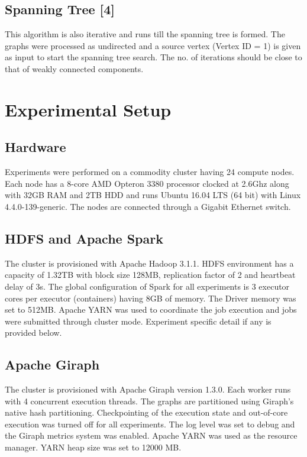 \documentclass[11pt,a4paper,oneside]{article}
\begin{document}
	\subsection{Spanning Tree [4]}
	This algorithm is also iterative and runs till the spanning tree is formed. The graphs were processed as undirected and a source vertex (Vertex ID = 1) is given as input to start the spanning tree search. The no. of iterations should be close to that of weakly connected components.
	     
    \section{Experimental Setup}
    
    \subsection{Hardware}
    Experiments were performed on a commodity cluster having 24 compute nodes. Each node has a 8-core AMD Opteron 3380 processor clocked at 2.6Ghz along with 32GB RAM and 2TB HDD and runs Ubuntu 16.04 LTS (64 bit) with Linux 4.4.0-139-generic. The nodes are connected through a Gigabit Ethernet switch.
    
    \subsection{HDFS and Apache Spark}
    The cluster is provisioned with Apache Hadoop 3.1.1. HDFS environment has a capacity of 1.32TB with block size 128MB, replication factor of 2 and heartbeat delay of 3s. The global configuration of Spark for all experiments is 3 executor cores per executor (containers) having 8GB of memory. The Driver memory was set to 512MB. Apache YARN was used to coordinate the job execution and jobs were submitted through cluster mode. Experiment specific detail if any is provided below.
    
    \subsection{Apache Giraph}
    The cluster is provisioned with Apache Giraph version 1.3.0. Each worker runs with 4 concurrent execution threads. The graphs are partitioned using Giraph's native hash partitioning. Checkpointing of the execution state and out-of-core execution was turned off for all experiments. The log level was set to debug and the Giraph metrics system was enabled. Apache YARN was used as the resource manager. YARN heap size was set to 12000 MB. 
    
\end{document}
